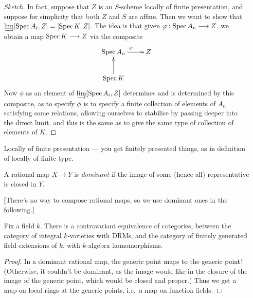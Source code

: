 \documentclass[11pt]{article}
\begin{document}
\begin{Oct18}
\begin{proof}[Sketch]
In fact, suppose that $Z$ is an $S$-scheme locally of finite presentation, and suppose for simplicity that both $Z$ and $S$ are affine. Then we want to show that $\varinjlim [\operatorname{Spec} A_i,Z]=[\operatorname{Spec} K,Z]$. The idea is that given $\varphi:\operatorname{Spec} A_n\longrightarrow Z$, we obtain a map $\operatorname{Spec} K\longrightarrow Z$ via the composite
\[\xymatrix{
\spec A_n\ar[r]^\phi&Z\\
\spec K\ar[u]
}\]
Now $\phi$ as an element of $\varinjlim [\operatorname{Spec} A_i,Z]$ determines and is determined by this composite, as to specify $\phi$ is to specify a finite collection of elements of $A_n$ satisfying some relations, allowing ourselves to stabilise by passing deeper into the direct limit, and this is the same as to give the same type of collection of elements of $K$.
\end{proof}
\begin{defn*}
Locally of finite presentation --- you get finitely presented things, as in definition of locally of finite type.
\end{defn*}
\begin{defn*}
A rational map $X\to Y$ is \emph{dominant} if the image of some (hence all) representative is closed in $Y$.
\end{defn*}
[There's no way to compose rational maps, so we use dominant ones in the following.]
\begin{thm*}
Fix a field $k$. There is a contravariant equivalence of categories, between the category of integral $k$-varieties with DRMs, and the category of finitely generated field extensions of $k$, with $k$-algebra homomorphisms.
\end{thm*}
\begin{proof}
In a dominant rational map, the generic point maps to the generic point! (Otherwise, it couldn't be dominant, as the image would like in the closure of the image of the generic point, which would be closed and proper.) Thus we get a map on local rings at the generic points, i.e.\ a map on function fields.


\end{proof}
\end{Oct18}
\end{document}
